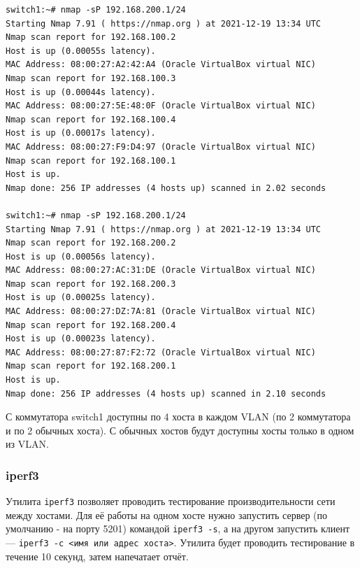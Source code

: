 \documentclass{article}
\begin{document}
\begin{lstlisting}
switch1:~# nmap -sP 192.168.200.1/24
Starting Nmap 7.91 ( https://nmap.org ) at 2021-12-19 13:34 UTC
Nmap scan report for 192.168.100.2
Host is up (0.00055s latency).
MAC Address: 08:00:27:A2:42:A4 (Oracle VirtualBox virtual NIC)
Nmap scan report for 192.168.100.3
Host is up (0.00044s latency).
MAC Address: 08:00:27:5E:48:0F (Oracle VirtualBox virtual NIC)
Nmap scan report for 192.168.100.4
Host is up (0.00017s latency).
MAC Address: 08:00:27:F9:D4:97 (Oracle VirtualBox virtual NIC)
Nmap scan report for 192.168.100.1
Host is up.
Nmap done: 256 IP addresses (4 hosts up) scanned in 2.02 seconds

switch1:~# nmap -sP 192.168.200.1/24
Starting Nmap 7.91 ( https://nmap.org ) at 2021-12-19 13:34 UTC
Nmap scan report for 192.168.200.2
Host is up (0.00056s latency).
MAC Address: 08:00:27:AC:31:DE (Oracle VirtualBox virtual NIC)
Nmap scan report for 192.168.200.3
Host is up (0.00025s latency).
MAC Address: 08:00:27:DZ:7A:81 (Oracle VirtualBox virtual NIC)
Nmap scan report for 192.168.200.4
Host is up (0.00023s latency).
MAC Address: 08:00:27:87:F2:72 (Oracle VirtualBox virtual NIC)
Nmap scan report for 192.168.200.1
Host is up.
Nmap done: 256 IP addresses (4 hosts up) scanned in 2.10 seconds
\end{lstlisting}
С коммутатора switch1 доступны по 4 хоста в каждом VLAN (по 2 коммутатора и по 2 обычных хоста). С обычных хостов будут доступны хосты только в одном из VLAN.

\subsubsection{iperf3}
Утилита \verb|iperf3| позволяет проводить тестирование производительности сети между хостами. Для её работы на одном хосте нужно запустить сервер (по умолчанию - на порту 5201) командой \verb|iperf3 -s|, а на другом запустить клиент --- \verb|iperf3 -c <имя или адрес хоста>|. Утилита будет проводить тестирование в течение 10 секунд, затем напечатает отчёт.
\end{document}
